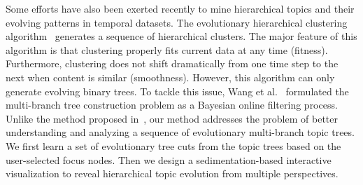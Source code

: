 Some efforts have also been exerted recently to mine hierarchical topics and their evolving patterns in temporal datasets.
The evolutionary hierarchical clustering algorithm~\cite{Chakrabarti2006} generates a sequence of hierarchical clusters.
The major feature of this algorithm is that clustering properly fits current data at any time (fitness). Furthermore, clustering does not shift dramatically from one time step to the next when content is similar (smoothness).
However, this algorithm can only generate evolving binary trees.
To tackle this issue, Wang et al.~\cite{Wang2013}
formulated the multi-branch tree construction problem as  a Bayesian online filtering process.
Unlike the method proposed in~\cite{Wang2013}, our method addresses the problem of better understanding and analyzing a sequence of evolutionary multi-branch topic trees.
We first learn a set of evolutionary tree cuts from the topic trees based on the user-selected focus nodes.
Then we design a sedimentation-based interactive visualization to reveal hierarchical topic evolution from multiple perspectives.

